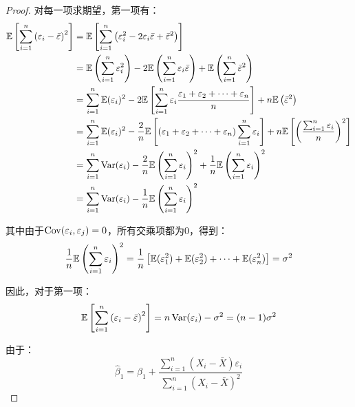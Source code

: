 \documentclass[11pt]{article}
\begin{document}
\begin{proof}
    对每一项求期望，第一项有：
    \begin{align*}
        \mathbb{E} \left[ \sum_{i=1}^{n} \left( \varepsilon_i - \bar{\varepsilon} \right)^2 \right]
        &= \mathbb{E} \left[ \sum_{i=1}^{n} \left( \varepsilon_i^2 - 2 \varepsilon_i \bar{\varepsilon} + \bar{\varepsilon}^2 \right) \right] \\
        &= \mathbb{E} \left( \sum_{i=1}^{n}  \varepsilon_i^2 \right) - 2 \mathbb{E} \left( \sum_{i=1}^{n}  \varepsilon_i \bar{\varepsilon} \right) + \mathbb{E} \left( \sum_{i=1}^{n} \bar{\varepsilon}^2 \right) \\
        &= \sum_{i=1}^{n} \mathbb{E} (\varepsilon_i)^2 - 2\mathbb{E} \left[ \sum_{i=1}^{n} \varepsilon_i \frac{\varepsilon_1 + \varepsilon_2 + \dots + \varepsilon_n}{n} \right] + n\mathbb{E} \left( \bar{\varepsilon}^2 \right) \\
        &= \sum_{i=1}^{n} \mathbb{E} (\varepsilon_i)^2 - \frac{2}{n} \mathbb{E} \left[ \left( \varepsilon_1 + \varepsilon_2 + \dots + \varepsilon_n \right) \sum_{i=1}^{n} \varepsilon_i \right] + n \mathbb{E}\left[ \left(\frac{\sum_{i=1}^{n} \varepsilon_i}{n} \right)^2 \right] \\
        &= \sum_{i=1}^{n} \operatorname{Var}(\varepsilon_i) - \frac{2}{n} \mathbb{E} \left( \sum_{i=1}^{n} \varepsilon_i \right)^2 + \frac{1}{n} \mathbb{E} \left( \sum_{i=1}^{n} \varepsilon_i \right)^2 \\
        &= \sum_{i=1}^{n} \operatorname{Var}(\varepsilon_i) - \frac{1}{n} \mathbb{E} \left( \sum_{i=1}^{n} \varepsilon_i \right)^2
    \end{align*}

    其中由于$\operatorname{Cov}(\varepsilon_i, \varepsilon_j)=0$，所有交乘项都为0，得到：
    \begin{equation*}
        \frac{1}{n} \mathbb{E} \left( \sum_{i=1}^{n} \varepsilon_i \right)^2
        = \frac{1}{n} \left[ \mathbb{E}(\varepsilon_1^2) + \mathbb{E}(\varepsilon_2^2) + \dots + \mathbb{E}(\varepsilon_n^2) \right]
        = \sigma^2
    \end{equation*}
    
    因此，对于第一项：
    \begin{equation*}
        \mathbb{E} \left[ \sum_{i=1}^{n} \left( \varepsilon_i - \bar{\varepsilon} \right)^2 \right] = n\operatorname{Var}(\varepsilon_i) - \sigma^2 = (n-1)\sigma^2
    \end{equation*}

    由于：
    \begin{equation*}
        \hat{\beta}_1 = \beta_1 + \frac{\sum_{i=1}^{n}\left(X_i - \bar{X}\right) \varepsilon_i}{\sum_{i=1}^{n} \left( X_i - \bar{X} \right)^2}
    \end{equation*}


\end{proof}
\end{document}
